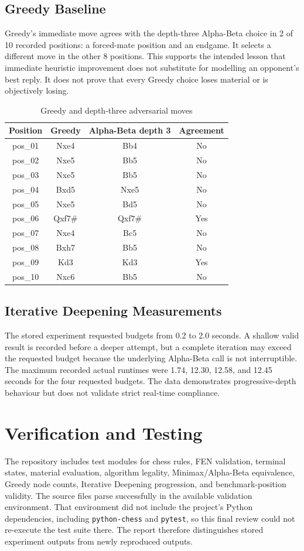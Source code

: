 \documentclass[12pt,a4paper]{report}
\begin{document}
\section{Greedy Baseline}
Greedy's immediate move agrees with the depth-three Alpha-Beta choice in 2 of 10 recorded positions: a forced-mate position and an endgame. It selects a different move in the other 8 positions. This supports the intended lesson that immediate heuristic improvement does not substitute for modelling an opponent's best reply. It does not prove that every Greedy choice loses material or is objectively losing.
\begin{table}[H]\centering\caption{Greedy and depth-three adversarial moves}\small
\begin{tabular}{cccc}\toprule Position & Greedy & Alpha-Beta depth 3 & Agreement\\\midrule
pos\_01 & Nxe4 & Bb4 & No\\pos\_02 & Nxe5 & Bb5 & No\\pos\_03 & Nxe5 & Bb5 & No\\pos\_04 & Bxd5 & Nxe5 & No\\pos\_05 & Nxe5 & Bd5 & No\\pos\_06 & Qxf7\# & Qxf7\# & Yes\\pos\_07 & Nxe4 & Bc5 & No\\pos\_08 & Bxh7 & Bb5 & No\\pos\_09 & Kd3 & Kd3 & Yes\\pos\_10 & Nxc6 & Bb5 & No\\\bottomrule
\end{tabular}\end{table}

\section{Iterative Deepening Measurements}
The stored experiment requested budgets from 0.2 to 2.0 seconds. A shallow valid result is recorded before a deeper attempt, but a complete iteration may exceed the requested budget because the underlying Alpha-Beta call is not interruptible. The maximum recorded actual runtimes were 1.74, 12.30, 12.58, and 12.45 seconds for the four requested budgets. The data demonstrates progressive-depth behaviour but does not validate strict real-time compliance.

\chapter{Verification and Testing}
The repository includes test modules for chess rules, FEN validation, terminal states, material evaluation, algorithm legality, Minimax/Alpha-Beta equivalence, Greedy node counts, Iterative Deepening progression, and benchmark-position validity. The source files parse successfully in the available validation environment. That environment did not include the project's Python dependencies, including \texttt{python-chess} and \texttt{pytest}, so this final review could not re-execute the test suite there. The report therefore distinguishes stored experiment outputs from newly reproduced outputs.
\end{document}

